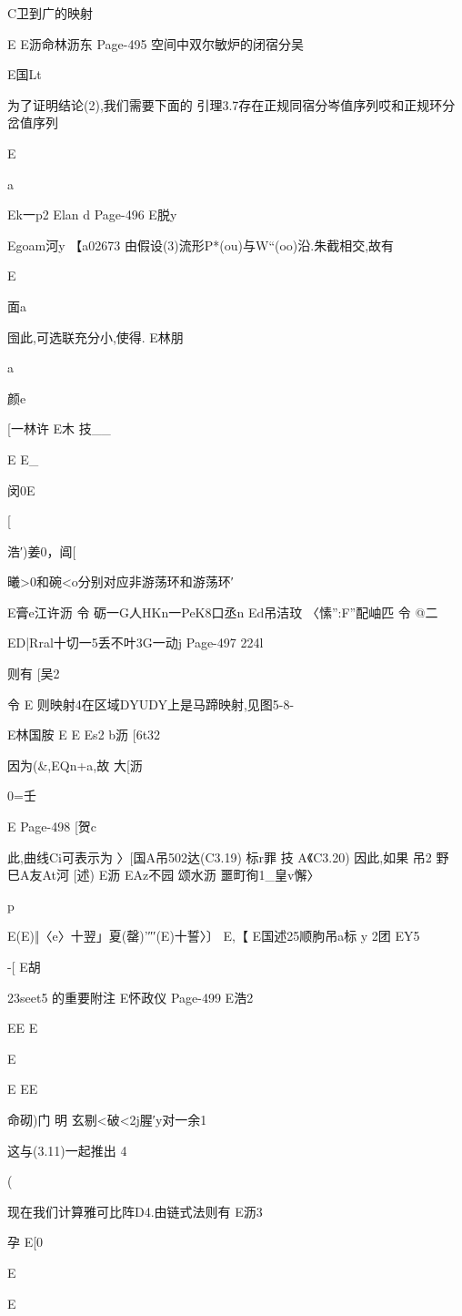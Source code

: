 {{{{{C卫到广的映射

E
E沥命林沥东
Page-495
空间中双尔敏炉的闭宿分吴

E国Lt

为了证明结论(2),我们需要下面的
引理3.7存在正规同宿分岑值序列哎和正规环分岔值序列

E

a

Ek一p2
Elan
d
Page-496
E脱y

Egoam河y
【a02673
由假设(3)流形P*(ou)与W“(oo)沿.朱截相交,故有

E

面a

囹此,可选联充分小,使得.
E林朋

a

颜e

[一林许
E木
技__

E
E_

闵0E

[

浩′)姜0，阊[

曦>0和碗<o分别对应非游荡环和游荡环′

E膏e江许沥
令
砺一G人HKn一PeK8口丞n
Ed吊洁玟
〈愫”:F”配岫匹
令
@二{ED|Rral十切一5丢不叶3G一动j
Page-497
224l

则有
[吴2

令
E
则映射4在区域DYUDY上是马蹄映射,见图5-8-

E林国胺
E
E
Es2
b沥
[6t32

因为(&,EQn+a,故
大[沥

0=壬

E
Page-498
[贺c

此,曲线Ci可表示为
〉[国A吊502达(C3.19)
标r罪
技
A《C3.20)
因此,如果
吊2
野
巳A友At河
[述)
E沥
EAz不园
颂水沥
噩町徇1_皇v懈〉

p

E(E)‖〈e〉十翌」夏(罄)'″′(E)十誓〉〕
E,【
E国述25顺朐吊a标
y
2团
EY5

-[
E胡

23seet5
的重要附注
E怀政仪
Page-499
E浩2

EE
E

E

E
EE

命砌)门
明
玄剔<破<2j腥′y对一余1

这与(3.11)一起推出
4

(

现在我们计算雅可比阵D4.由链式法则有
E沥3

孕
E[0

E

E

}}}}}}
